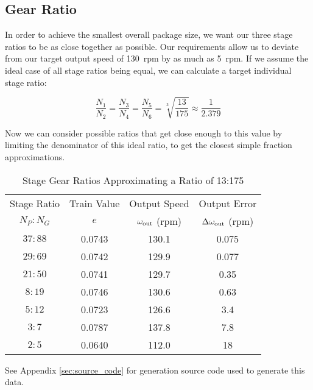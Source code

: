 \documentclass[titlepage]{article} %
\begin{document}
\subsection{Gear Ratio}
In order to achieve the smallest overall package size, we want our three stage 
ratios to be as close together as possible. Our requirements allow us to deviate
from our target output speed of \SI{130}{rpm} by as much as \SI{5}{rpm}. If we
assume the ideal case of all stage ratios being equal, we can calculate a target
individual stage ratio:

\begin{equation*}
    \frac{N_1}{N_2} = \frac{N_3}{N_4} = \frac{N_5}{N_6} = \sqrt[3]{\frac{13}{175}} \approx \frac{1}{2.379}
\end{equation*}

Now we can consider possible ratios that get close enough to this value by
limiting the denominator of this ideal ratio, to get the closest simple fraction
approximations.

\begin{table}[h]
    \centering
    \begin{threeparttable}
        \caption{Stage Gear Ratios Approximating a Ratio of 13:175}
        \vspace{0.25cm}
        \setlength{\tabcolsep}{10pt}
        \begin{tabular}{cccc}
            \toprule
            Stage Ratio & Train Value & Output Speed & Output Error \\
            $N_P:N_G$ & $e$ & $\omega_\textup{out}$ (rpm) & $\Delta\omega_\textup{out}$ (rpm) \\
            \midrule
            $37:88$ & 0.0743 & 130.1 & 0.075 \\
            $29:69$ & 0.0742 & 129.9 & 0.077 \\
            $21:50$ & 0.0741 & 129.7 & 0.35 \\
            $8:19$  & 0.0746 & 130.6 & 0.63 \\
            $5:12$  & 0.0723 & 126.6 & 3.4 \\
            $3:7$   & 0.0787 & 137.8 & 7.8 \\
            $2:5$   & 0.0640 & 112.0 & 18 \\
            \bottomrule
        \end{tabular}
        \label{tab:gear_ratios}
        \begin{tablenotes}
            \footnotesize
            \centering
            \item See Appendix \ref{sec:source_code} for generation source code used to
            generate this data.
        \end{tablenotes}
    \end{threeparttable}
\end{table}
\end{document}
